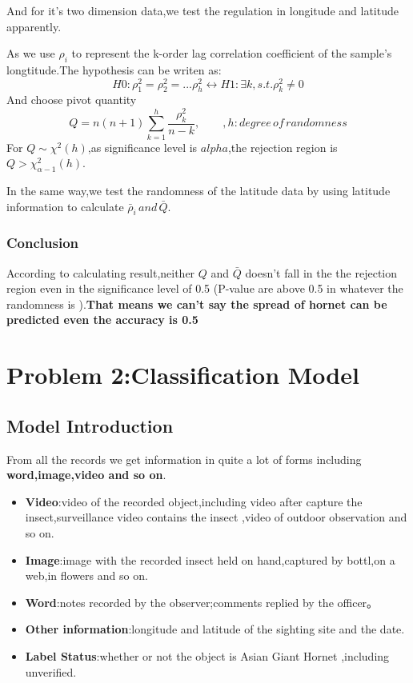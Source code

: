\documentclass[12pt]{article}
\begin{document}
And for it's two dimension data,we test the regulation in longitude and latitude apparently.

As we use $\rho_i$ to represent the k-order lag correlation coefficient of the sample's longtitude.The  hypothesis can be writen as:
\begin{equation*}
H0:\rho_1^2=\rho_2^2=...\rho_h^2 \leftrightarrow H1:\exists k,s.t. \rho_k^2\neq 0
\end{equation*}
And choose pivot quantity
\begin{equation*}
Q=n(n+1)\sum_{k=1}^h \frac{\rho_k^2}{n-k},\qquad ,h:degree \,of\, randomness
\end{equation*}
For $Q\sim \chi^2(h)$,as significance level is $alpha$,the rejection region is $Q> \chi^2_{\alpha-1}(h)$.

In the same way,we test the randomness of the latitude data by using latitude information to calculate $\bar\rho_i\,and\,\bar{Q}$.

\subsubsection{Conclusion}
According to calculating result,neither $Q$ and $\bar{Q}$ doesn't fall in the  the rejection region even in the significance level of 0.5 (P-value are above 0.5 in whatever the randomness is ).\textbf{That means we can't say the spread of hornet can be predicted even the accuracy is 0.5}

\section{Problem 2:Classification Model}
\subsection{Model Introduction}
From all the records we get information in quite a lot of forms including \textbf{word,image,video and so on}.
\begin{itemize}
	\item \textbf{Video}:video of the recorded object,including video after capture the insect,surveillance video contains the insect ,video of outdoor observation and so on.
	\item \textbf{Image}:image with the recorded insect held on hand,captured by bottl,on a web,in flowers and so on.
	\item \textbf{Word}:notes recorded by the observer;comments replied by the officer。
	\item \textbf{Other information}:longitude and latitude of the sighting site and the date.
	\item \textbf{Label Status}:whether or not the object is Asian Giant Hornet ,including unverified.
\end{itemize}
\end{document}
